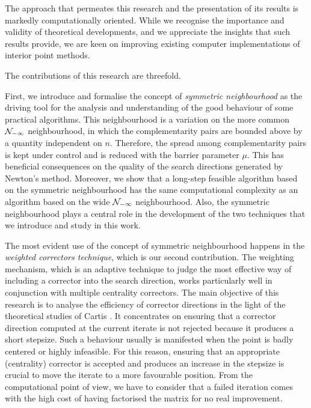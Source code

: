 The approach that permeates this research and 
the presentation of its results is markedly computationally oriented. 
While we recognise the importance and validity of theoretical developments, 
and we appreciate the insights that such results provide, 
we are keen on improving existing computer implementations of 
interior point methods.

The contributions of this research are threefold.

First, we introduce and formalise the concept of 
{\em symmetric neighbourhood} as the
driving tool for the analysis and understanding of the good behaviour
of some practical algorithms. 
This neighbourhood is a variation on the more common
$\mathcal{N}_{-\infty}$ neighbourhood, in which the complementarity pairs
are bounded above by a quantity independent on $n$.
Therefore, the spread among complementarity pairs is kept
under control and is reduced with the barrier parameter $\mu$.
This has beneficial consequences on the quality of the search
directions generated by Newton's method. Moreover, we show that
a long-step feasible algorithm based on the symmetric neighbourhood
has the same computational complexity as an algorithm based
on the wide $\mathcal{N}_{-\infty}$ neighbourhood.
Also, the symmetric neighbourhood plays a central role in the development 
of the two techniques that we introduce and study in this work.

The most evident use of the concept of symmetric neighbourhood
happens in the {\em weighted correctors technique},
which is our second contribution.
The weighting mechanism, which is an adaptive technique to judge the
most effective way of including a corrector into the search direction, 
works particularly well in conjunction with multiple centrality
correctors.
The main objective of this research is to analyse the efficiency of
corrector directions in the light of the theoretical studies of Cartis
\cite{Cartis04,Cartis05}. It concentrates on ensuring that a corrector
direction computed at the current iterate is not rejected because it
produces a short stepsize. Such a behaviour usually is manifested when
the point is badly centered or highly infeasible.
For this reason, ensuring that an appropriate (centrality) corrector
is accepted and produces an increase in the stepsize is crucial
to move the iterate to a more favourable position.
From the computational point of view, we have to consider that
a failed iteration comes with the high cost of having factorised
the matrix for no real improvement.

